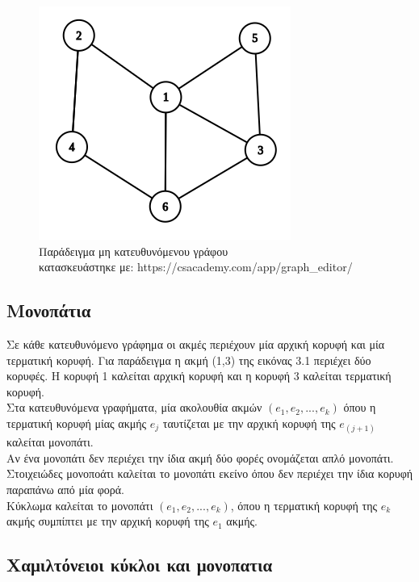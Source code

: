 \documentclass[oneside,12pt]{book}
\newenvironment{matlab}
	{\begin{figure}[hp]\centering\captionsetup{justification=centering}}
	{\end{figure}}
\theoremstyle{definition}
\begin{document}
\begin{matlab}
	\includegraphics[scale=0.8]{images/undirected_graph_example.png}
	\caption{Παράδειγμα μη κατευθυνόμενου γράφου \\ κατασκευάστηκε με: https://csacademy.com/app/graph\_editor/}
\end{matlab}   

\subsection{Μονοπάτια}

Σε κάθε κατευθυνόμενο γράφημα οι ακμές περιέχουν μία αρχική κορυφή και μία τερματική κορυφή. Για παράδειγμα η ακμή (1,3) της εικόνας 3.1 περιέχει δύο κορυφές. Η κορυφή 1 καλείται αρχική κορυφή και η κορυφή 3 καλείται τερματική κορυφή. \\

Στα κατευθυνόμενα γραφήματα, μία ακολουθία ακμών \((e_1, e_2,...,e_k)\) όπου η τερματική κορυφή μίας ακμής \(e_j\) ταυτίζεται με την αρχική κορυφή της \(e_{(j+1)}\) καλείται μονοπάτι. \\

Αν ένα μονοπάτι δεν περιέχει την ίδια ακμή δύο φορές ονομάζεται απλό μονοπάτι. \\

Στοιχειώδες μονοποάτι καλείται το μονοπάτι εκείνο όπου δεν περιέχει την ίδια κορυφή παραπάνω από μία φορά. \\

Κύκλωμα καλείται το μονοπάτι \((e_1, e_2,...,e_k)\), όπου η τερματική κορυφή της \(e_k\) ακμής συμπίπτει με την αρχική κορυφή της \(e_1\) ακμής. \\

\subsection{Χαμιλτόνειοι κύκλοι και μονοπατια}
\end{document}
